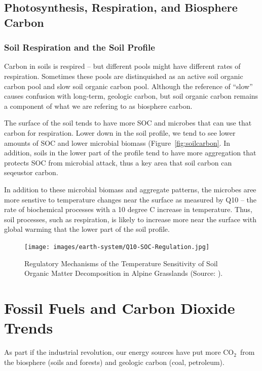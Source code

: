 \documentclass{book}\usepackage{knitr}
\newcommand{\carbondioxide}{CO$_2$~}
\begin{document}
\subsection{Photosynthesis, Respiration, and Biosphere Carbon}

\subsubsection{Soil Respiration and the Soil Profile}

Carbon in soils is respired -- but different pools might have different rates of respiration. Sometimes these pools are distinquished as an active soil organic carbon pool and slow soil organic carbon pool. Although the reference of ``slow'' causes confusion with long-term, geologic carbon, but soil organic carbon remains a component of what we are refering to as biosphere carbon. 

The surface of the soil tends to have more SOC and microbes that can use that carbon for respiration. Lower down in the soil profile, we tend to see lower amounts of SOC and lower microbial biomass (Figure~\ref{fig:soilcarbon}. In addition, soils in the lower part of the profile tend to have more aggregation that protects SOC from microbial attack, thus a key area that soil carbon can seqeustor carbon. 

In addition to these microbial biomass and aggregate patterns, the microbes aree more senstive to temperature changes near the surface as measured by Q10 -- the rate of biochemical processes with a 10 degree C increase in temperature. Thus, soil processes, such as respiration, is likely to increase more near the surface with global warming that the lower part of the soil profile.  

\begin{figure}
\texttt{[image: images/earth-system/Q10-SOC-Regulation.jpg]}
\caption{Regulatory Mechanisms of the Temperature Sensitivity of Soil Organic Matter Decomposition in Alpine Grasslands (Source: \citet{Qineaau1218, CAS2021researchers}).}
\label{fig:Q10-SOC}
\end{figure}


\section{Fossil Fuels and Carbon Dioxide Trends}\label{sec:fossilfuels}

As part if the industrial revolution, our energy sources have put more \carbondioxide from the biosphere (soils and forests) and geologic carbon (coal, petroleum). 
\end{document}
